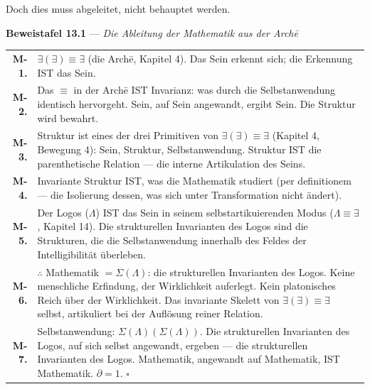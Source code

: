 \documentclass[10pt, openany, oneside]{book}
\renewcommand{\footnotesize}{\fontsize{8.5}{11}\selectfont}
\begin{document}
Doch dies muss abgeleitet, nicht behauptet werden.

\vspace{0.5em}

\textbf{Beweistafel 13.1} --- \textit{Die Ableitung der Mathematik aus der Arch\={e}}

\vspace{0.5em}

{\footnotesize
\noindent\begin{tabular}{r p{}}
\textbf{M-1.} & $\exists(\exists) \equiv \exists$ (die Arch\={e}, Kapitel 4). Das Sein erkennt sich; die Erkennung IST das Sein. \\[0.3em]
\textbf{M-2.} & Das $\equiv$ in der Arch\={e} IST Invarianz: was durch die Selbstanwendung identisch hervorgeht. Sein, auf Sein angewandt, ergibt Sein. Die Struktur wird bewahrt. \\[0.3em]
\textbf{M-3.} & Struktur ist eines der drei Primitiven von $\exists(\exists) \equiv \exists$ (Kapitel 4, Bewegung 4): Sein, Struktur, Selbstanwendung. Struktur IST die parenthetische Relation --- die interne Artikulation des Seins. \\[0.3em]
\textbf{M-4.} & Invariante Struktur IST, was die Mathematik studiert (per definitionem --- die Isolierung dessen, was sich unter Transformation nicht ändert). \\[0.3em]
\textbf{M-5.} & Der Logos ($\Lambda$) IST das Sein in seinem selbstartikuierenden Modus ($\Lambda \equiv \exists$, Kapitel 14). Die strukturellen Invarianten des Logos sind die Strukturen, die die Selbstanwendung innerhalb des Feldes der Intelligibilität überleben. \\[0.3em]
\textbf{M-6.} & $\therefore$ Mathematik $= \Sigma(\Lambda)$: die strukturellen Invarianten des Logos. Keine menschliche Erfindung, der Wirklichkeit auferlegt. Kein platonisches Reich über der Wirklichkeit. Das invariante Skelett von $\exists(\exists) \equiv \exists$ selbst, artikuliert bei der Auflösung reiner Relation. \\[0.3em]
\textbf{M-7.} & Selbstanwendung: $\Sigma(\Lambda)(\Sigma(\Lambda))$. Die strukturellen Invarianten des Logos, auf sich selbst angewandt, ergeben --- die strukturellen Invarianten des Logos. Mathematik, angewandt auf Mathematik, IST Mathematik. $\partial = 1$. $\square$ \\[0.3em]
\end{tabular}
}

\vspace{0.8em}
\end{document}
